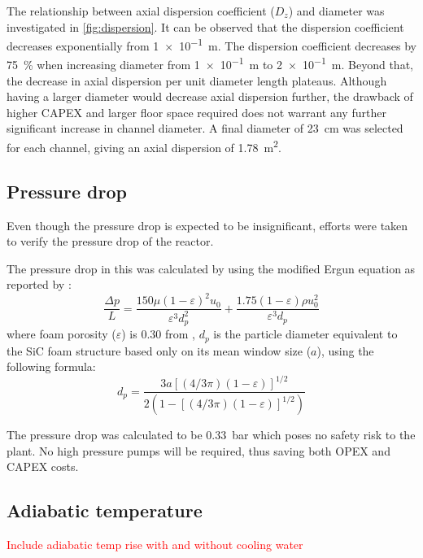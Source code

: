 The relationship between axial dispersion coefficient ($D_z$) and diameter was investigated in \cref{fig:dispersion}. It can be observed that the dispersion coefficient decreases exponentially from \SI{1e-1}{\m}. The dispersion coefficient decreases by \SI{75}{\%} when increasing diameter from \SI{1e-1}{\m} to \SI{2e-1}{\m}. Beyond that, the decrease in axial dispersion per unit diameter length plateaus. Although having a larger diameter would decrease axial dispersion further, the drawback of higher CAPEX and larger floor space required does not warrant any further significant increase in channel diameter. A final diameter of \SI{23}{\cm} was selected for each channel, giving an axial dispersion of \SI{1.78}{\metre \squared}. 
\subsection{Pressure drop}
Even though the pressure drop is expected to be insignificant, efforts were taken to verify the pressure drop of the reactor.

The pressure drop in this was calculated by using the modified Ergun equation as reported by \textcite{lacroix_pressure_2007}: 
\begin{equation}
    \frac{\Delta p}{L} = \frac{150 \mu (1- \varepsilon)^2 u_0}{\varepsilon^3 d_p^2} + \frac{1.75(1-\varepsilon)\rho u_0^2}{\varepsilon^3 d_p}
    \label{eqn:ergun}
\end{equation}
where foam porosity ($\varepsilon$) is 0.30 from \cite{jang_thermophysical_2007}, $d_p$ is the particle diameter equivalent to the SiC foam structure based only on its mean window size ($a$), using the following formula:
\begin{equation}
d_{p}=\frac{3a[(4 / 3 \pi)(1-\varepsilon)]^{1 / 2}}{2(1-[(4 / 3 \pi)(1-\varepsilon)]^{1 / 2})}
\end{equation}

The pressure drop was calculated to be \SI{0.33}{\bar} which poses no safety risk to the plant. No high pressure pumps will be required, thus saving both OPEX and CAPEX costs.


\subsection{Adiabatic temperature}

\label{sec:adiabatic}
\textcolor{red}{Include adiabatic temp rise with and without cooling water}

